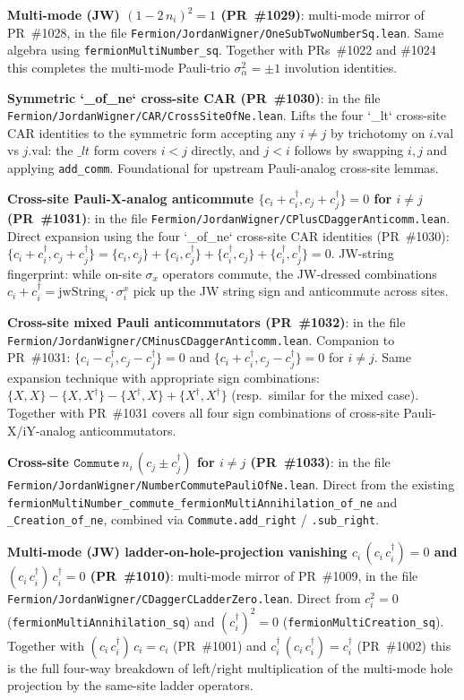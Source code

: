 \documentclass[a4paper,11pt]{article}
\begin{document}
\textbf{Multi-mode (JW) $(1 - 2\,n_i)^2 = 1$ (PR~\#1029)}:
multi-mode mirror of PR~\#1028, in the file
\texttt{Fermion/JordanWigner/OneSubTwoNumberSq.lean}. Same
algebra using \texttt{fermionMultiNumber\_sq}. Together with
PRs~\#1022 and \#1024 this completes the multi-mode Pauli-trio
$\sigma_\alpha^2 = \pm 1$ involution identities.

\textbf{Symmetric `\_of\_ne` cross-site CAR (PR~\#1030)}: in
the file
\texttt{Fermion/JordanWigner/CAR/CrossSiteOfNe.lean}. Lifts the
four `\_lt` cross-site CAR identities to the symmetric form
accepting any $i \neq j$ by trichotomy on $i.\mathrm{val}$ vs
$j.\mathrm{val}$: the $\_lt$ form covers $i < j$ directly, and
$j < i$ follows by swapping $i, j$ and applying \texttt{add\_comm}.
Foundational for upstream Pauli-analog cross-site lemmas.

\textbf{Cross-site Pauli-X-analog anticommute
$\{c_i + c_i^\dagger, c_j + c_j^\dagger\} = 0$ for $i \neq j$
(PR~\#1031)}: in the file
\texttt{Fermion/JordanWigner/CPlusCDaggerAnticomm.lean}. Direct
expansion using the four `\_of\_ne` cross-site CAR identities
(PR~\#1030):
$\{c_i + c_i^\dagger, c_j + c_j^\dagger\} = \{c_i, c_j\} +
\{c_i, c_j^\dagger\} + \{c_i^\dagger, c_j\} +
\{c_i^\dagger, c_j^\dagger\} = 0$. JW-string fingerprint: while
on-site $\sigma_x$ operators commute, the JW-dressed
combinations $c_i + c_i^\dagger = \mathrm{jwString}_i \cdot
\sigma^x_i$ pick up the JW string sign and anticommute across
sites.

\textbf{Cross-site mixed Pauli anticommutators (PR~\#1032)}: in
the file
\texttt{Fermion/JordanWigner/CMinusCDaggerAnticomm.lean}.
Companion to PR~\#1031: $\{c_i - c_i^\dagger, c_j - c_j^\dagger\}
= 0$ and $\{c_i + c_i^\dagger, c_j - c_j^\dagger\} = 0$ for
$i \neq j$. Same expansion technique with appropriate sign
combinations: $\{X, X\} - \{X, X^\dagger\} - \{X^\dagger, X\}
+ \{X^\dagger, X^\dagger\}$ (resp.\ similar for the mixed
case). Together with PR~\#1031 covers all four sign
combinations of cross-site Pauli-X/iY-analog anticommutators.

\textbf{Cross-site $\texttt{Commute}\,n_i\,(c_j \pm
c_j^\dagger)$ for $i \neq j$ (PR~\#1033)}: in the file
\texttt{Fermion/JordanWigner/NumberCommutePauliOfNe.lean}.
Direct from the existing
\texttt{fermionMultiNumber\_commute\_fermionMultiAnnihilation\_of\_ne}
and \texttt{\_Creation\_of\_ne}, combined via
\texttt{Commute.add\_right} / \texttt{.sub\_right}.

\textbf{Multi-mode (JW) ladder-on-hole-projection vanishing
$c_i\,(c_i\,c_i^\dagger) = 0$ and $(c_i\,c_i^\dagger)\,
c_i^\dagger = 0$ (PR~\#1010)}: multi-mode mirror of PR~\#1009,
in the file
\texttt{Fermion/JordanWigner/CDaggerCLadderZero.lean}. Direct
from $c_i^2 = 0$ (\texttt{fermionMultiAnnihilation\_sq}) and
$(c_i^\dagger)^2 = 0$ (\texttt{fermionMultiCreation\_sq}).
Together with $(c_i\,c_i^\dagger)\,c_i = c_i$ (PR~\#1001) and
$c_i^\dagger\,(c_i\,c_i^\dagger) = c_i^\dagger$ (PR~\#1002)
this is the full four-way breakdown of left/right
multiplication of the multi-mode hole projection by the
same-site ladder operators.
\end{document}
